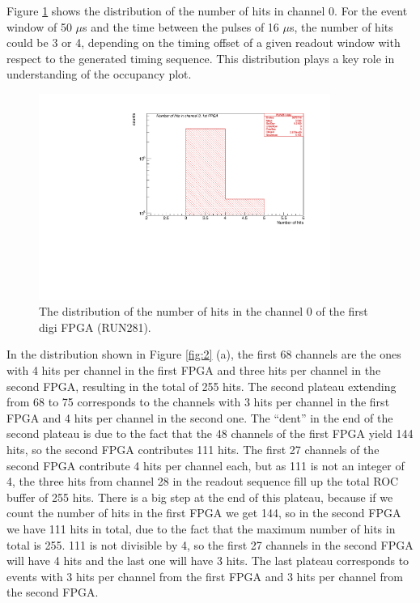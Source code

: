 Figure \ref{fig:66} shows the distribution of the number of hits in channel 0.
For the event window of 50 $\mu$s and the time between the pulses of 16 $\mu$s,
the number of hits could be 3 or 4,
depending on the timing offset of a given readout window with respect to the generated timing sequence.
This distribution plays a key role in understanding of the occupancy plot.
\begin{figure}[!h]
\centering
\includegraphics[width =0.85\textwidth]{figures/pdf/figure_00066_nhits_ch00_run281.pdf}
\caption{
  The distribution of the number of hits in the channel 0 of the first digi FPGA (RUN281).
}
\label{fig:66}
\end{figure}

In the distribution shown in Figure \ref{fig:2} (a),
the first 68 channels are the ones with 4 hits per channel in the first FPGA
and three hits per channel in the second FPGA, 
resulting in the total of 255 hits.
The second plateau extending from 68 to 75 corresponds to the channels
with 3 hits per channel in the first FPGA and 4 hits per channel in the second one.
  The ``dent'' in the end of the second plateau is due to the fact that the 48 channels of the first FPGA
  yield 144 hits, so the second FPGA contributes 111 hits. The first 27 channels of the second FPGA contribute
  4 hits per channel each, but as 111 is not an integer of 4, the three hits from channel 28 in the readout sequence
  fill up the total ROC buffer of 255 hits.
There is a big step at the end of this plateau, because if we count the number of hits
in the first FPGA we get 144, so in the second FPGA we have 111 hits in total,
due to the fact that the maximum number of hits in total is 255.
111 is not divisible by 4, so the first 27 channels in the second FPGA will have 4 hits
and the last one will have 3 hits.
The last plateau corresponds to events with 3 hits per channel from the first FPGA
and 3 hits per channel from the second FPGA.

